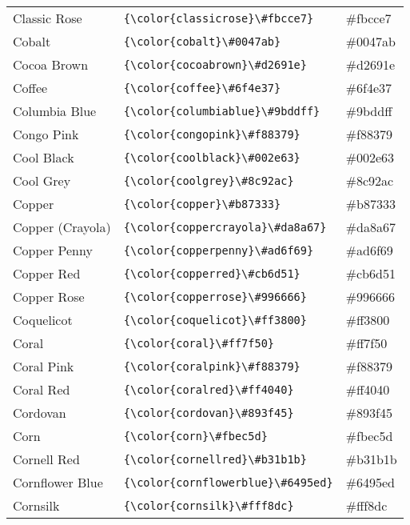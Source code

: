 \documentclass[9.5pt]{article}
\begin{document}
\begin{longtable}{l | l | l}
	Classic Rose & \verb!{\color{classicrose}\#fbcce7}! & {\color{classicrose}\#fbcce7}\\
	Cobalt & \verb!{\color{cobalt}\#0047ab}! & {\color{cobalt}\#0047ab}\\
	Cocoa Brown & \verb!{\color{cocoabrown}\#d2691e}! & {\color{cocoabrown}\#d2691e}\\
	Coffee & \verb!{\color{coffee}\#6f4e37}! & {\color{coffee}\#6f4e37}\\
	Columbia Blue & \verb!{\color{columbiablue}\#9bddff}! & {\color{columbiablue}\#9bddff}\\
	Congo Pink & \verb!{\color{congopink}\#f88379}! & {\color{congopink}\#f88379}\\
	Cool Black & \verb!{\color{coolblack}\#002e63}! & {\color{coolblack}\#002e63}\\
	Cool Grey & \verb!{\color{coolgrey}\#8c92ac}! & {\color{coolgrey}\#8c92ac}\\
	Copper & \verb!{\color{copper}\#b87333}! & {\color{copper}\#b87333}\\
	Copper (Crayola) & \verb!{\color{coppercrayola}\#da8a67}! & {\color{coppercrayola}\#da8a67}\\
	Copper Penny & \verb!{\color{copperpenny}\#ad6f69}! & {\color{copperpenny}\#ad6f69}\\
	Copper Red & \verb!{\color{copperred}\#cb6d51}! & {\color{copperred}\#cb6d51}\\
	Copper Rose & \verb!{\color{copperrose}\#996666}! & {\color{copperrose}\#996666}\\
	Coquelicot & \verb!{\color{coquelicot}\#ff3800}! & {\color{coquelicot}\#ff3800}\\
	Coral & \verb!{\color{coral}\#ff7f50}! & {\color{coral}\#ff7f50}\\
	Coral Pink & \verb!{\color{coralpink}\#f88379}! & {\color{coralpink}\#f88379}\\
	Coral Red & \verb!{\color{coralred}\#ff4040}! & {\color{coralred}\#ff4040}\\
	Cordovan & \verb!{\color{cordovan}\#893f45}! & {\color{cordovan}\#893f45}\\
	Corn & \verb!{\color{corn}\#fbec5d}! & {\color{corn}\#fbec5d}\\
	Cornell Red & \verb!{\color{cornellred}\#b31b1b}! & {\color{cornellred}\#b31b1b}\\
	Cornflower Blue & \verb!{\color{cornflowerblue}\#6495ed}! & {\color{cornflowerblue}\#6495ed}\\
	Cornsilk & \verb!{\color{cornsilk}\#fff8dc}! & {\color{cornsilk}\#fff8dc}\\

\end{longtable}
\end{document}
